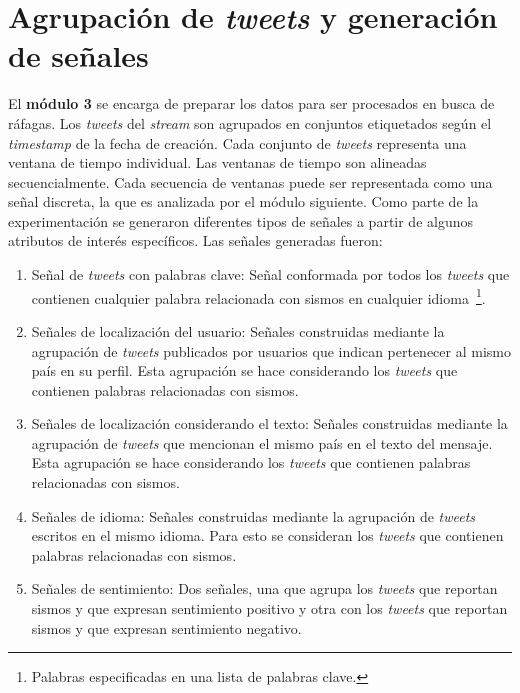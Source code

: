 \section{Agrupación de \textit{tweets} y generación de señales}

El \textbf{módulo 3} se encarga de preparar los datos para ser procesados en busca de ráfagas.
%
Los \textit{tweets} del \textit{stream} son agrupados en conjuntos etiquetados según el \textit{timestamp} de la fecha de creación. 
%
Cada conjunto de \textit{tweets} representa una ventana de tiempo individual. 
%
Las ventanas de tiempo son alineadas secuencialmente.
%
Cada secuencia de ventanas puede ser representada como una señal discreta, la que es analizada por el módulo siguiente.
%
Como parte de la experimentación se generaron diferentes tipos de señales a partir de algunos atributos de interés específicos. %
%
Las señales generadas fueron:

\begin{enumerate}
\item Señal de \textit{tweets} con palabras clave: Señal conformada por todos los \textit{tweets} que contienen cualquier palabra relacionada con sismos en cualquier idioma~\footnote{Palabras especificadas en una lista de palabras clave.}. 
\item Señales de localización del usuario: Señales construidas mediante la agrupación de \textit{tweets} publicados por usuarios que indican pertenecer al mismo país en su perfil. Esta agrupación se hace considerando los \textit{tweets} que contienen palabras relacionadas con sismos.
\item Señales de localización considerando el texto: Señales construidas mediante la agrupación de \textit{tweets} que mencionan el mismo país en el texto del mensaje. Esta agrupación se hace considerando los \textit{tweets} que contienen palabras relacionadas con sismos.
\item Señales de idioma: Señales construidas mediante la agrupación de \textit{tweets} escritos en el mismo idioma. Para esto se consideran los \textit{tweets} que contienen palabras relacionadas con sismos.
\item Señales de sentimiento: Dos señales, una que agrupa los \textit{tweets} que reportan sismos y que expresan sentimiento positivo y otra con los \textit{tweets} que reportan sismos y que expresan sentimiento negativo. 
\end{enumerate}

